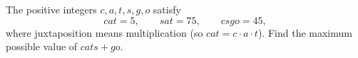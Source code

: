 The positive integers $c,a,t,s,g,o$ satisfy
\[
cat=5,\qquad sat=75,\qquad csgo=45,
\]
where juxtaposition means multiplication (so $cat=c\cdot a\cdot t$). Find the maximum possible value of $cats+go$.
